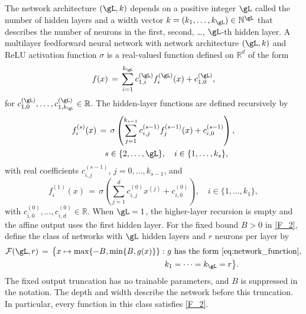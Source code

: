 \documentclass[twoside,11pt]{article}
\newenvironment{revision}{\color{revisionred}}{}
\begin{document}
The network architecture \( (\gL, k) \) depends on a positive integer \( \gL \) called the number of hidden layers and a width vector \( k = (k_1, \ldots, k_{\gL}) \in \mathbb{N}^{\gL} \) that describes the number of neurons in the first, second, \ldots, \( \gL \)-th hidden layer. A multilayer feedforward neural network with network architecture \( (\gL, k) \) and ReLU activation function \( \sigma \) is a real-valued function defined on \( \mathbb{R}^d \) of the form
\begin{revision}
\begin{equation} \label{eq:network_function}
f(x) \,=\, \sum_{i=1}^{k_{\gL}} c_{1,i}^{(\gL)} f_i^{(\gL)}(x) + c_{1,0}^{(\gL)},
\end{equation}
for \( c_{1,0}^{(\gL)}, \ldots, c_{1,k_{\gL}}^{(\gL)} \in \mathbb{R} \).
The hidden-layer functions are defined recursively by
\begin{align}
f_i^{(s)}(x) &\,=\, \sigma \left( \sum_{j=1}^{k_{s-1}} c_{i,j}^{(s-1)} f_j^{(s-1)}(x) + c_{i,0}^{(s-1)} \right), \\
&\quad s \in \{2, \ldots, \gL\}, \quad i \in \{1,\ldots,k_s\}, \nonumber
\end{align}
with real coefficients \(c_{i,j}^{(s-1)}\), \(j=0,\ldots,k_{s-1}\), and
\begin{equation} \label{eq:first_layer_function}
f_i^{(1)}(x) \,=\, \sigma \left( \sum_{j=1}^d c_{i,j}^{(0)} x^{(j)} + c_{i,0}^{(0)} \right),
\quad i \in \{1,\ldots,k_1\},
\end{equation}
with \(c_{i,0}^{(0)},\ldots,c_{i,d}^{(0)}\in\mathbb R\).
When \(\gL=1\), the higher-layer recursion is empty and the affine
output uses the first hidden layer.
\end{revision}
\begin{revision}
For the fixed bound \(B>0\) in \eqref{F_2}, define the class of
networks with \(\gL\) hidden layers and \(r\) neurons per layer by
\begin{equation}
\label{eq:space_of_networks}
\begin{aligned}
\mathcal F(\gL,r)
\,=\,\bigl\{x\mapsto\max\{-B,\min\{B,g(x)\}\}:&
\ g\text{ has the form \eqref{eq:network_function}},\\
& k_1=\cdots=k_{\gL}=r\bigr\}.
\end{aligned}
\end{equation}
The fixed output truncation has no trainable parameters, and
\(B\) is suppressed in the notation. The depth and width describe
the network before this truncation. In particular, every function
in this class satisfies \eqref{F_2}.
\end{revision}
\end{document}
